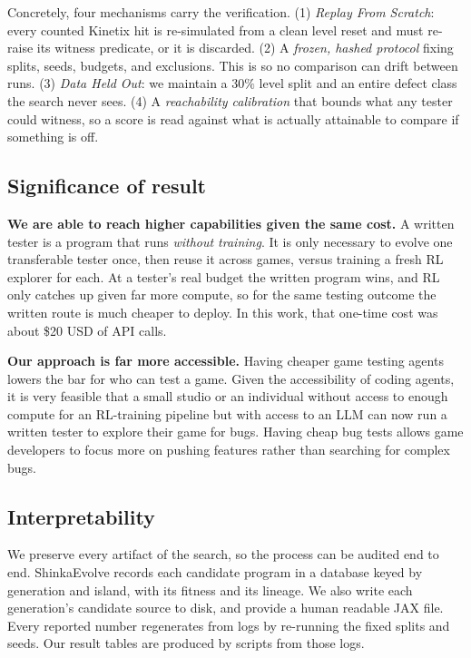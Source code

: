 \documentclass{article}
\begin{document}
Concretely, four mechanisms carry the verification. (1) \emph{Replay From Scratch}: every counted Kinetix hit is
re-simulated from a clean level reset and must re-raise its witness predicate, or it is discarded. (2) A \emph{frozen, hashed protocol} fixing splits, seeds, budgets, and exclusions. This is so no comparison can drift between runs. (3) \emph{Data Held Out}: we maintain a $30\%$ level split and an entire defect class the search never
sees. (4) A \emph{reachability calibration} that bounds what any tester could witness, so a score is read against what is
actually attainable to compare if something is off.

\subsection{Significance of result}
\label{sec:significance}
\textbf{We are able to reach higher capabilities given the same cost.} A written tester is a program that runs
\emph{without training}. It is only necessary to evolve one transferable tester once, then reuse it across games, versus
training a fresh RL explorer for each. At a tester's real budget the written program wins, and RL only catches up given far
more compute, so for the same testing outcome the written route is much cheaper to deploy. In this work, that one-time cost
was about \$20 USD of API calls.

\textbf{Our approach is far more accessible.} Having cheaper game testing agents lowers the bar for who can test a game.
Given the accessibility of coding agents, it is very feasible that a small studio or an individual without access to enough
compute for an RL-training pipeline but with access to an LLM can now run a written tester to explore their game for bugs.
Having cheap bug tests allows game developers to focus more on pushing features rather than searching for complex bugs.

\subsection{Interpretability}
\label{sec:interp}
We preserve every artifact of the search, so the process can be audited end to end. ShinkaEvolve records each candidate
program in a database keyed by generation and island, with its fitness and its lineage. We also write each generation's candidate source to disk, and provide a human readable JAX file. Every reported number regenerates from logs by re-running the fixed splits and seeds. Our result tables are
produced by scripts from those logs. 
\end{document}
